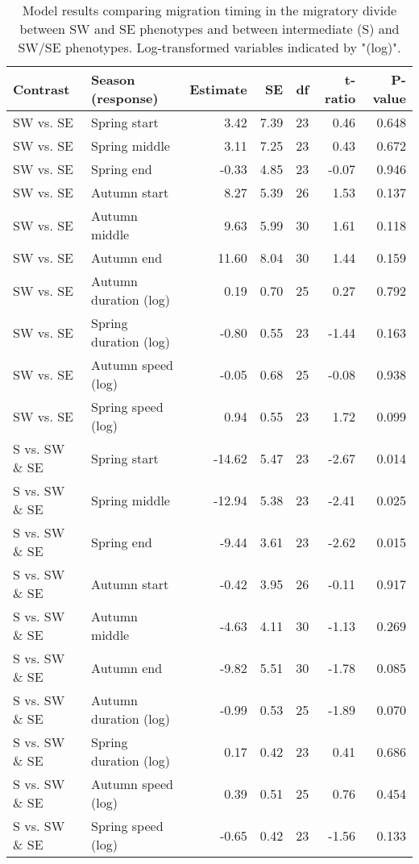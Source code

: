 \documentclass[a4paper, nobind]{templates/ociamthesis}
\begin{document}
\begin{table}[t]

\caption{\label{tab:divide-timing-table}Model results comparing migration timing in the migratory divide between SW and SE phenotypes and between intermediate (S) and SW/SE phenotypes. Log-transformed variables indicated by "(log)".}
\centering
\fontsize{9.5}{11.5}\selectfont
\begin{tabular}{l|l|r|r|r|r|r}
\hline
Contrast & Season (response) & Estimate & SE & df & t-ratio & P-value\\
\hline
SW vs. SE & Spring start & 3.42 & 7.39 & 23 & 0.46 & 0.648\\
\hline
SW vs. SE & Spring middle & 3.11 & 7.25 & 23 & 0.43 & 0.672\\
\hline
SW vs. SE & Spring end & -0.33 & 4.85 & 23 & -0.07 & 0.946\\
\hline
SW vs. SE & Autumn start & 8.27 & 5.39 & 26 & 1.53 & 0.137\\
\hline
SW vs. SE & Autumn middle & 9.63 & 5.99 & 30 & 1.61 & 0.118\\
\hline
SW vs. SE & Autumn end & 11.60 & 8.04 & 30 & 1.44 & 0.159\\
\hline
SW vs. SE & Autumn duration (log) & 0.19 & 0.70 & 25 & 0.27 & 0.792\\
\hline
SW vs. SE & Spring duration (log) & -0.80 & 0.55 & 23 & -1.44 & 0.163\\
\hline
SW vs. SE & Autumn speed (log) & -0.05 & 0.68 & 25 & -0.08 & 0.938\\
\hline
SW vs. SE & Spring speed (log) & 0.94 & 0.55 & 23 & 1.72 & 0.099\\
\hline
S vs. SW \& SE & Spring start & -14.62 & 5.47 & 23 & -2.67 & 0.014\\
\hline
S vs. SW \& SE & Spring middle & -12.94 & 5.38 & 23 & -2.41 & 0.025\\
\hline
S vs. SW \& SE & Spring end & -9.44 & 3.61 & 23 & -2.62 & 0.015\\
\hline
S vs. SW \& SE & Autumn start & -0.42 & 3.95 & 26 & -0.11 & 0.917\\
\hline
S vs. SW \& SE & Autumn middle & -4.63 & 4.11 & 30 & -1.13 & 0.269\\
\hline
S vs. SW \& SE & Autumn end & -9.82 & 5.51 & 30 & -1.78 & 0.085\\
\hline
S vs. SW \& SE & Autumn duration (log) & -0.99 & 0.53 & 25 & -1.89 & 0.070\\
\hline
S vs. SW \& SE & Spring duration (log) & 0.17 & 0.42 & 23 & 0.41 & 0.686\\
\hline
S vs. SW \& SE & Autumn speed (log) & 0.39 & 0.51 & 25 & 0.76 & 0.454\\
\hline
S vs. SW \& SE & Spring speed (log) & -0.65 & 0.42 & 23 & -1.56 & 0.133\\
\hline
\end{tabular}
\end{table}
\end{document}
